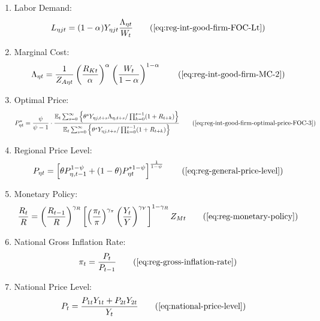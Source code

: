 \documentclass[../thesis.tex]{subfiles}
\begin{document}
{\begin{itemize}
\begin{enumerate}
		\item Labor Demand:
		\begin{align}
			L_{\eta jt} = (1-{\alpha_{}}) Y_{\eta jt} \frac{\Lambda_{\eta t}}{W_t} \tag{\ref{eq:reg-int-good-firm-FOC-Lt}}
		\end{align}
		
		\item Marginal Cost:
		\begin{align}
			\Lambda_{\eta t} = \frac{1}{Z_{A\eta t}} \left( \frac{R_{Kt}}{{\alpha_{}}} \right)^{{\alpha_{}}} \left( \frac{W_t}{1-{\alpha_{}}} \right)^{1-{\alpha_{}}} \tag{\ref{eq:reg-int-good-firm-MC-2}}
		\end{align}
		
		\item Optimal Price:
		\begin{align}
			P_{\eta t}^{\ast} = \frac{\psi}{\psi-1} \cdot \frac{ \E \sum_{s=0}^{\infty} \left\{ \theta^s Y_{\eta j,t+s} \Lambda_{\eta, t+s} / \prod_{k=0}^{s-1}(1+R_{t+k}) \right\}} {\E \sum_{s=0}^{\infty} \left\{ \theta^s Y_{\eta j,t+s} / \prod_{k=0}^{s-1}(1 + R_{t+k}) \right\}} \tag{\ref{eq:reg-int-good-firm-optimal-price-FOC-3}}
		\end{align}
		
		\item Regional Price Level:
		\begin{align}
			P_{\eta t} = \left[ \theta P_{\eta,t-1}^{1-\psi} + (1-\theta) P_{\eta t}^{\ast 1-\psi} \right]^\frac{1}{1-\psi} \tag{\ref{eq:reg-general-price-level}}
		\end{align}
		
		\item Monetary Policy:
		\begin{align}
			\frac{R_{t}}{R} = \left( \frac{R_{t-1}}{R} \right)^{\gamma_R} \left[ \left( \frac{\pi_t}{\pi} \right)^{\gamma_\pi} \left( \frac{Y_{t}}{Y} \right)^{\gamma_Y} \right]^{1-\gamma_R} Z_{Mt} \tag{\ref{eq:reg-monetary-policy}}
		\end{align}
		
		\item National Gross Inflation Rate:
		\begin{align}
			\pi_t = \frac{P_t}{P_{t-1}} \tag{\ref{eq:reg-gross-inflation-rate}}
		\end{align}
		
		\item National Price Level:
		\begin{align}
			P_{t} &= \frac{P_{1t} Y_{1t} + P_{2t} Y_{2t}}{Y_{t}} \tag{\ref{eq:national-price-level}} %
		\end{align}
		

\end{enumerate}
\end{itemize}}
\end{document}
